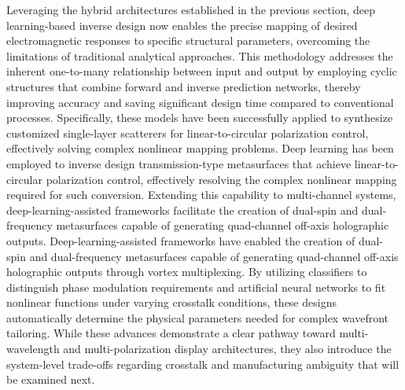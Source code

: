 \documentclass[11pt]{article}
\begin{document}
Leveraging the hybrid architectures established in the previous section, deep learning-based inverse design now enables the precise mapping of desired electromagnetic responses to specific structural parameters, overcoming the limitations of traditional analytical approaches. This methodology addresses the inherent one-to-many relationship between input and output by employing cyclic structures that combine forward and inverse prediction networks, thereby improving accuracy and saving significant design time compared to conventional processes. Specifically, these models have been successfully applied to synthesize customized single-layer scatterers for linear-to-circular polarization control, effectively solving complex nonlinear mapping problems. Deep learning has been employed to inverse design transmission-type metasurfaces that achieve linear-to-circular polarization control, effectively resolving the complex nonlinear mapping required for such conversion. \citep{doi_10_1088_1361_6463_acefdf_20072f6c} Extending this capability to multi-channel systems, deep-learning-assisted frameworks facilitate the creation of dual-spin and dual-frequency metasurfaces capable of generating quad-channel off-axis holographic outputs. Deep-learning-assisted frameworks have enabled the creation of dual-spin and dual-frequency metasurfaces capable of generating quad-channel off-axis holographic outputs through vortex multiplexing. \citep{doi_10_1117_1_apn_2_1_016010_57069347} By utilizing classifiers to distinguish phase modulation requirements and artificial neural networks to fit nonlinear functions under varying crosstalk conditions, these designs automatically determine the physical parameters needed for complex wavefront tailoring. While these advances demonstrate a clear pathway toward multi-wavelength and multi-polarization display architectures, they also introduce the system-level trade-offs regarding crosstalk and manufacturing ambiguity that will be examined next. \citep{doi_10_1088_1361_6463_acefdf_20072f6c} \citep{doi_10_1117_1_apn_2_1_016010_57069347}
\end{document}
